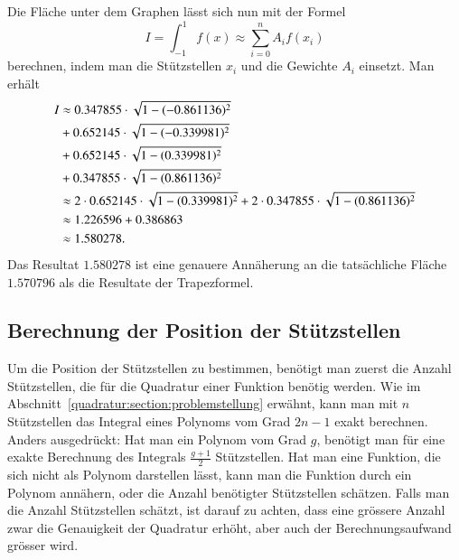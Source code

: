 Die Fläche unter dem Graphen lässt sich nun mit der Formel 
\begin{equation}
    I 
    =
    \int_{-1}^{1} f(x) 
    \approx
    \sum_{i=0}^{n} A_{i} f(x_{i})
\end{equation}
berechnen, indem man die Stützstellen $x_{i}$ und die Gewichte $A_{i}$ einsetzt.
Man erhält
\begin{align}
    \centering
    I 
    &\approx 
    0.347855 \cdot \sqrt{1-(-0.861136)^{2}} 
    \notag
    \\
    &+ 
    0.652145 \cdot \sqrt{1-(-0.339981)^{2}} 
    \notag
    \\
    &+ 
    0.652145 \cdot \sqrt{1-(0.339981)^{2}} 
    \notag
    \\
    &+ 
    0.347855 \cdot \sqrt{1-(0.861136)^{2}} 
    \notag
    \\
    &\approx 2 \cdot 0.652145 \cdot \sqrt{1-(0.339981)^{2}} + 2 \cdot 0.347855 \cdot \sqrt{1-(0.861136)^{2}} 
    \notag
    \\
    &\approx 1.226596 + 0.386863 
    \notag
    \\
    &\approx 1.580278.
\end{align}
Das Resultat $1.580278$ ist eine genauere Annäherung an die 
tatsächliche Fläche $1.570796$ als die Resultate der Trapezformel. 

\subsection{Berechnung der Position der Stützstellen
\label{quadratur:subsection:stützstellenberechnung}}
Um die Position der Stützstellen zu bestimmen, benötigt man zuerst die Anzahl Stützstellen, 
die für die Quadratur einer Funktion benötig werden.
Wie im Abschnitt~\ref{quadratur:section:problemstellung} erwähnt, 
kann man mit $n$ Stützstellen das Integral eines Polynoms vom Grad $2n-1$ exakt berechnen.
Anders ausgedrückt: Hat man ein Polynom vom Grad $g$, 
benötigt man für eine exakte Berechnung des Integrals $\frac{g+1}{2}$ Stützstellen.
Hat man eine Funktion, die sich nicht als Polynom darstellen lässt, 
kann man die Funktion durch ein Polynom annähern, 
oder die Anzahl benötigter Stützstellen schätzen.
Falls man die Anzahl Stützstellen schätzt, ist darauf zu achten, 
dass eine grössere Anzahl zwar die Genauigkeit der Quadratur erhöht,
aber auch der Berechnungsaufwand grösser wird.

